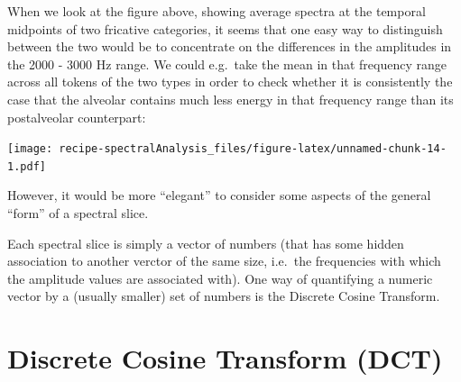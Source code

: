\documentclass[]{book}
\newenvironment{Shaded}{\begin{snugshade}}{\end{snugshade}}
\newcommand{\DataTypeTok}[1]{\textcolor[rgb]{0.13,0.29,0.53}{#1}}
\newcommand{\DecValTok}[1]{\textcolor[rgb]{0.00,0.00,0.81}{#1}}
\newcommand{\KeywordTok}[1]{\textcolor[rgb]{0.13,0.29,0.53}{\textbf{#1}}}
\newcommand{\NormalTok}[1]{#1}
\newcommand{\OperatorTok}[1]{\textcolor[rgb]{0.81,0.36,0.00}{\textbf{#1}}}
\newcommand{\StringTok}[1]{\textcolor[rgb]{0.31,0.60,0.02}{#1}}
\begin{document}
When we look at the figure above, showing average spectra at the temporal midpoints of two fricative categories, it seems that one easy way to distinguish between the two would be to concentrate on the differences in the amplitudes in the 2000 - 3000 Hz range. We could e.g.~take the mean in that frequency range across all tokens of the two types in order to check whether it is consistently the case that the alveolar contains much less energy in that frequency range than its postalveolar counterpart:

\begin{Shaded}
\end{Shaded}

\texttt{[image: recipe-spectralAnalysis\_files/figure-latex/unnamed-chunk-14-1.pdf]}

However, it would be more ``elegant'' to consider some aspects of the general ``form'' of a spectral slice.

Each spectral slice is simply a vector of numbers (that has some hidden association to another verctor of the same size, i.e.~the frequencies with which the amplitude values are associated with). One way of quantifying a numeric vector by a (usually smaller) set of numbers is the Discrete Cosine Transform.

\hypertarget{discrete-cosine-transform-dct}{%
\section{Discrete Cosine Transform (DCT)}\label{discrete-cosine-transform-dct}}
\end{document}
